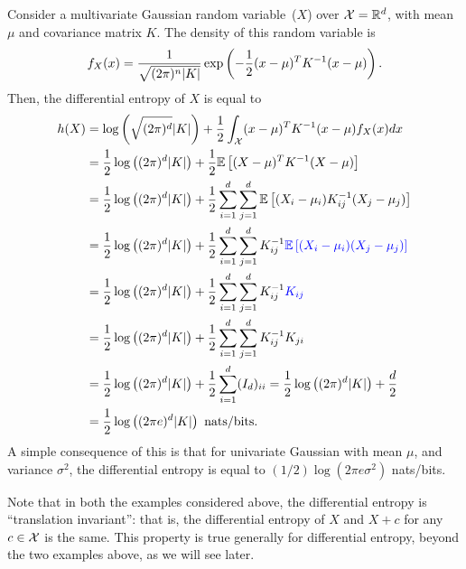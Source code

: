         \begin{example}
            \label{example:diff-ent-gaussian} 
            Consider a multivariate Gaussian random variable~($X$) over $\mathcal{X} = \mathbb{R}^d$, with mean $\mu$ and covariance matrix $K$. The density of this random variable is 
            \begin{align}
                f_X(x) = \frac{1}{\sqrt{(2\pi)^n |K|}} \exp\left( - \frac{1}{2} (x-\mu)^TK^{-1}(x-\mu) \right). 
            \end{align}
            Then, the differential entropy of $X$ is equal to 
            \begin{align}
                h(X)  &=  \log \left( \sqrt{(2\pi)^d} |K| \right) + \frac{1}{2}\int_{\mathcal{X}} (x-\mu)^{T} K^{-1} (x-\mu)f_X(x) dx\\
                &=  \frac{1}{2}\log \left( (2\pi)^d |K| \right) + \frac{1}{2} \mathbb{E}\left[ (X-\mu)^{T} K^{-1} (X-\mu) \right] \\
                &= \frac{1}{2}\log \left( (2\pi)^d |K| \right) + \frac{1}{2} \sum_{i=1}^d \sum_{j=1}^d \mathbb{E}\left[ (X_i - \mu_i)K^{-1}_{ij}(X_j-\mu_j)  \right] \\
                &= \frac{1}{2}\log \left( (2\pi)^d |K| \right) + \frac{1}{2} \sum_{i=1}^d \sum_{j=1}^d K^{-1}_{ij}\textcolor{blue}{\mathbb{E}\left[ (X_i - \mu_i)(X_j-\mu_j)  \right]}  \\
                &= \frac{1}{2}\log \left( (2\pi)^d |K| \right) +  \frac{1}{2} \sum_{i=1}^d \sum_{j=1}^d K^{-1}_{ij}\textcolor{blue}{K_{ij}}  \\
                &= \frac{1}{2}\log \left( (2\pi)^d |K| \right) + \frac{1}{2} \sum_{i=1}^d \sum_{j=1}^d K^{-1}_{ij}K_{ji}  \\
                &=  \frac{1}{2}\log \left( (2\pi)^d |K| \right) + \frac{1}{2} \sum_{i=1}^d (I_d)_{ii} 
                = \frac{1}{2}\log \left( (2\pi)^d |K| \right) + \frac{d}{2}  \\
                & =  \frac{1}{2} \log \left( (2\pi e)^d |K| \right) \text{ nats/bits}. 
            \end{align}
            A simple consequence of this is that for univariate Gaussian with mean $\mu$, and variance $\sigma^2$, the differential entropy is equal to $(1/2) \log (2\pi e \sigma^2)$ nats/bits. 
        \end{example}

        \begin{remark}
            \label{remark:translation-invariant} Note that in both the examples considered above, the differential entropy is ``translation invariant'': that is, the differential entropy of $X$ and $X + c$ for any $c \in \mathcal{X}$ is the same. This property is true generally for differential entropy, beyond the two examples above, as we will see later. 
        \end{remark}

